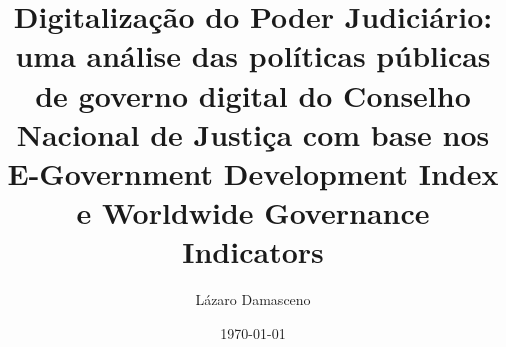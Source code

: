 \documentclass[12pt, a4paper]{report}
\begin{document}
\title{Digitalização do Poder Judiciário: uma análise das políticas públicas de governo digital do Conselho Nacional de Justiça com base nos E-Government Development Index e Worldwide Governance Indicators} 

\author{Lázaro Damasceno}
\date{\today}
\maketitle

\listoffigures
\listoftables
\tableofcontents








\end{document}

